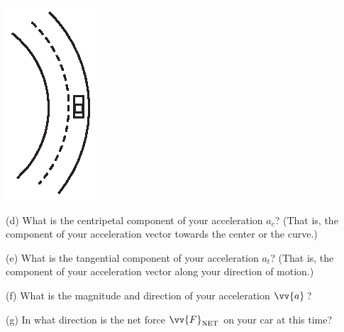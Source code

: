 \hspace{1.0in}\includegraphics{tangential_and_centripetal_acc/curve2.eps}

(d) What is the centripetal component of your acceleration $a_c$?  (That is, the component of your acceleration vector towards the center or the curve.)
\answerspace{0.3in}

(e) What is the tangential component of your acceleration $a_t$?  (That is, the component of your acceleration vector along your direction of motion.)
\answerspace{0.3in}

(f) What is the magnitude and direction of your acceleration $\vv{a}\,$?
\answerspace{1.5in}

(g) In what direction is the net force $\vv{F}_{\rm NET}$ on your car at this time?
\answerspace{0.5in}



